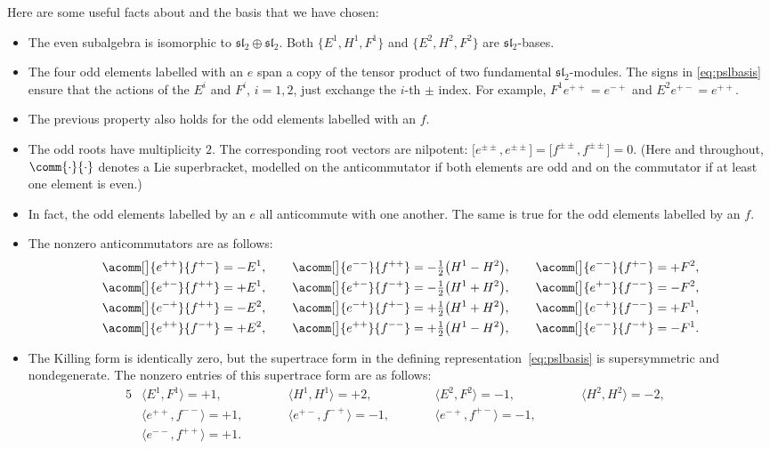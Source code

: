 \documentclass[pdftex]{sigma}
\numberwithin{equation}{section}
\newcommand{\alg}[1]{\mathfrak{#1}} %
\newcommand{\SLA}[2]{\alg{#1}_{#2}} %
\newcommand{\SLSA}[3]{\alg{#1}_{#2 \vert #3}} %
\newcommand{\sltwo}{\SLA{sl}{2}}
\newcommand{\psl}{\SLSA{psl}{2}{2}}
\begin{document}
Here are some useful facts about \smash{$\psl$} and the basis that we have chosen:
\begin{itemize}\itemsep=0pt
	\item The even subalgebra is isomorphic to $\sltwo \oplus \sltwo$.
	Both $\big\{ E^1,H^1,F^1\big\}$ and $\big\{ E^2,H^2,F^2\big\}$ are $\sltwo$-bases.
	\item The four odd elements labelled with an $e$ span a copy of the tensor product of two fundamental $\sltwo$-modules.
	The signs in \eqref{eq:pslbasis} ensure that the actions of the $E^i$ and $F^i$, $i=1,2$, just exchange the $i$-th $\pm$ index.
	For example,
$
		F^1 e^{++} = e^{-+}$ and $ E^2 e^{+-} = e^{++}$.
	\item The previous property also holds for the odd elements labelled with an $f$.
	\item The odd roots have multiplicity $2$.
	The corresponding root vectors are nilpotent: $\big\lbrack e^{\pm\pm},e^{\pm\pm}\big\rbrack = \big\lbrack f^{\pm\pm},f^{\pm\pm}\big\rbrack = 0$.
	(Here and throughout, $\comm{\cdot}{\cdot}$ denotes a Lie superbracket, modelled on the anticommutator if both elements are odd and on the commutator if at least one element is even.)
	\item In fact, the odd elements labelled by an $e$ all anticommute with one another.
	The same is true for the odd elements labelled by an $f$.
	\item The nonzero anticommutators are as follows:
		\begin{gather*}%
	\acomm[\big]{e^{++}}{f^{+-}} = -E^1, \qquad \acomm[\big]{e^{--}}{f^{++}} = -\tfrac{1}{2}\big(H^1-H^2\big), \qquad \acomm[\big]{e^{--}}{f^{+-}} = +F^2, \\
			\acomm[\big]{e^{+-}}{f^{++}} = +E^1, \qquad \acomm[\big]{e^{+-}}{f^{-+}} = -\tfrac{1}{2}\big(H^1+H^2\big), \qquad \acomm[\big]{e^{+-}}{f^{--}} = -F^2, \\
			\acomm[\big]{e^{-+}}{f^{++}} = -E^2, \qquad \acomm[\big]{e^{-+}}{f^{+-}} = +\tfrac{1}{2}\big(H^1+H^2\big), \qquad \acomm[\big]{e^{-+}}{f^{--}} = +F^1, \\
			\acomm[\big]{e^{++}}{f^{-+}} = +E^2, \qquad\acomm[\big]{e^{++}}{f^{--}} = +\tfrac{1}{2}\big(H^1-H^2\big), \qquad \acomm[\big]{e^{--}}{f^{-+}} = -F^1.
	\end{gather*}
	\item The Killing form is identically zero, but the supertrace form in the defining representation~\eqref{eq:pslbasis} is supersymmetric and nondegenerate.
	The nonzero entries of this supertrace form are as follows:
	\begin{alignat}{5}
			&\big\langle E^1,F^1\big\rangle = +1, \qquad&& \big\langle H^1,H^1\big\rangle = +2, \qquad&& \big\langle E^2,F^2\big\rangle = -1, \qquad&& \big\langle H^2,H^2\big\rangle = -2,&\nonumber \\
			&\big\langle e^{++},f^{--}\big\rangle = +1, \qquad&&\big\langle e^{+-},f^{-+}\big\rangle = -1, \qquad&& \big\langle e^{-+},f^{+-}\big\rangle = -1, \qquad && & \nonumber\\
& \big\langle e^{--},f^{++}\big\rangle = +1. &&&&&& &\label{eq:supertrace}
		\end{alignat}
\end{itemize}
\end{document}

